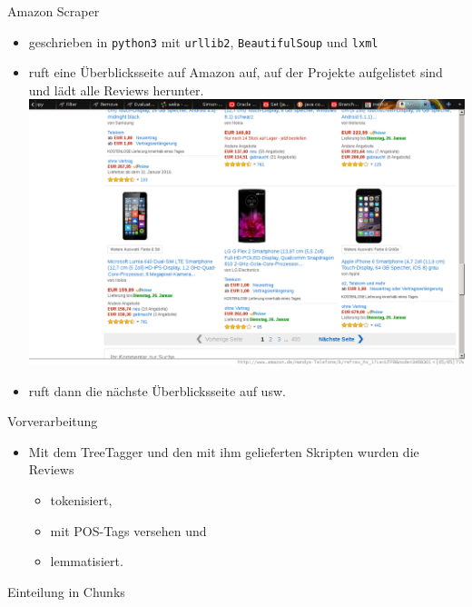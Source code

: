 \documentclass[note=hide]{beamer} %
\newcommand{\pymodule}[1]{\texttt{#1}}
\newcommand{\proglang}[1]{\texttt{#1}}
\begin{document}
\begin{frame}{Amazon Scraper}
	\begin{itemize}
		\item geschrieben in \proglang{python3} mit \pymodule{urllib2}, \pymodule{BeautifulSoup} und \pymodule{lxml}
		\item ruft eine Überblicksseite auf Amazon auf, auf der Projekte aufgelistet sind und lädt alle Reviews herunter.\\[0.3cm]
			\includegraphics[height=0.6\textheight]{amazon_overview_smartphones.png}
		\item ruft dann die nächste Überblicksseite auf usw.
	\end{itemize}
\end{frame}

\begin{frame}[fragile]{Vorverarbeitung}
	\begin{itemize}
		\item Mit dem TreeTagger und den mit ihm gelieferten Skripten wurden die Reviews
			\begin{itemize}
				\item tokenisiert,
				\item mit POS-Tags versehen und
				\item lemmatisiert. \\[0.3cm]
			\end{itemize}
	\end{itemize}
	
\end{frame}

\begin{frame}{Einteilung in Chunks}

\end{frame}
\end{document}
